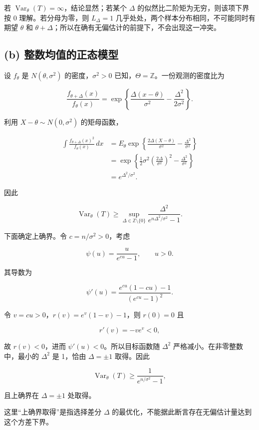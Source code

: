 若 $\operatorname{Var}_\theta(T)=\infty$，结论显然；若某个 $\Delta$ 的似然比二阶矩为无穷，则该项下界按 0 理解。若分母为零，则 $L_\Delta=1$ 几乎处处，两个样本分布相同，不可能同时有期望 $\theta$ 和 $\theta+\Delta$；所以在确有无偏估计的前提下，不会出现这一冲突。

\subsection{(b) 整数均值的正态模型}

设 $f_\theta$ 是 $N(\theta,\sigma^2)$ 的密度，$\sigma^2>0$ 已知，$\Theta=\mathbb Z$。一份观测的密度比为

\[
\frac{f_{\theta+\Delta}(x)}{f_\theta(x)}
=\exp\left\{\frac{\Delta(x-\theta)}{\sigma^2}
-\frac{\Delta^2}{2\sigma^2}\right\}.
\]

利用 $X-\theta\sim N(0,\sigma^2)$ 的矩母函数，

\[
\begin{aligned}
\int\frac{f_{\theta+\Delta}(x)^2}{f_\theta(x)}\,dx
&=E_\theta\exp\left\{
\frac{2\Delta(X-\theta)}{\sigma^2}
-\frac{\Delta^2}{\sigma^2}\right\}\\
&=\exp\left\{
\frac12\sigma^2\left(\frac{2\Delta}{\sigma^2}\right)^2
-\frac{\Delta^2}{\sigma^2}\right\}\\
&=e^{\Delta^2/\sigma^2}.
\end{aligned}
\]

因此

\[
\operatorname{Var}_\theta(T)
\ge\sup_{\Delta\in\mathbb Z\setminus\{0\}}
\frac{\Delta^2}{e^{n\Delta^2/\sigma^2}-1}.
\]

下面确定上确界。令 $c=n/\sigma^2>0$，考虑

\[
\psi(u)=\frac{u}{e^{cu}-1},\qquad u>0.
\]

其导数为

\[
\psi'(u)=
\frac{e^{cu}(1-cu)-1}{(e^{cu}-1)^2}.
\]

令 $v=cu>0$，$r(v)=e^v(1-v)-1$，则 $r(0)=0$ 且

\[
r'(v)=-ve^v<0,
\]

故 $r(v)<0$，进而 $\psi'(u)<0$。所以目标函数随 $\Delta^2$ 严格减小。在非零整数中，最小的 $\Delta^2$ 是 1，恰由 $\Delta=\pm1$ 取得。因此

\[
\boxed{\operatorname{Var}_\theta(T)
\ge\frac1{e^{n/\sigma^2}-1},}
\]

且上确界在 $\Delta=\pm1$ 处取得。

这里“上确界取得”是指选择差分 $\Delta$ 的最优化，不能据此断言存在无偏估计量达到这个方差下界。

